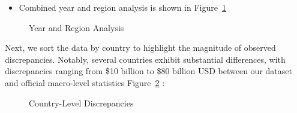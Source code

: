\documentclass[
  11pt,
]{article}
\providecommand{\tightlist}{%
  \setlength{\itemsep}{0pt}\setlength{\parskip}{0pt}}\usepackage{longtable,booktabs,array}
\begin{document}
\begin{itemize}
\tightlist
\item
  Combined year and region analysis is shown in
  Figure~\ref{fig-year-region}
\end{itemize}

\begin{figure}[H]


\caption{\label{fig-year-region}Year and Region Analysis}

\end{figure}%

Next, we sort the data by country to highlight the magnitude of observed
discrepancies. Notably, several countries exhibit substantial
differences, with discrepancies ranging from \$10 billion to \$80
billion USD between our dataset and official macro-level statistics
Figure~\ref{fig-country-discrepancies} :

\begin{figure}[H]


\caption{\label{fig-country-discrepancies}Country-Level Discrepancies}

\end{figure}%
\end{document}
